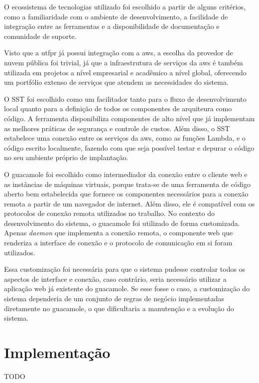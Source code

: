 O ecossistema de tecnologias utilizado foi escolhido a partir de alguns critérios, como a familiaridade com o ambiente de desenvolvimento, a facilidade de integração entre as ferramentas e a disponibilidade de documentação e comunidade de suporte.

Visto que a \gls{utfpr} já possui integração com a \gls{aws}, a escolha da provedor de nuvem pública foi trivial, já que a infraestrutura de serviços da \gls{aws} é também utilizada em projetos a nível empresarial e acadêmico a nível global, oferecendo um portfólio extenso de serviços que atendem as necessidades do sistema.

O SST foi escolhido como um facilitador tanto para o fluxo de desenvolvimento local quanto para a definição de todos os componentes de arquiteura como código. A ferramenta disponibiliza componentes de alto nível que já implementam as melhores práticas de segurança e controle de custos. Além disso, o SST estabelece uma conexão entre os serviços da \gls{aws}, como as funções Lambda, e o código escrito localmente, fazendo com que seja possível testar e depurar o código no seu ambiente próprio de implantação.

O \gls{guacamole} foi escolhido como intermediador da conexão entre o cliente web e as instâncias de máquinas virtuais, porque trata-se de uma ferramenta de código aberto bem estabelecida que fornece os componentes necessários para a conexão remota a partir de um navegador de internet. Além disso, ele é compatível com os protocolos de conexão remota utilizados no trabalho. No contexto do desenvolvimento do sistema, o \gls{guacamole} foi utilizado de forma customizada. Apenas \textit{daemon} que implementa a conexão remota, o componente web que renderiza a interface de conexão e o protocolo de comunicação em si foram utilizados.

Essa customização foi necessária para que o sistema pudesse controlar todos os aspectos de interface e conexão, caso contrário, seria necessário utilizar a aplicação web já existente do \gls{guacamole}. Se esse fosse o caso, a customização do sistema dependeria de um conjunto de regras de negócio implementadas diretamente no \gls{guacamole}, o que dificultaria a manutenção e a evolução do sistema.

\section{Implementa\c{c}\~ao}
\label{sec:implementacao}

TODO

